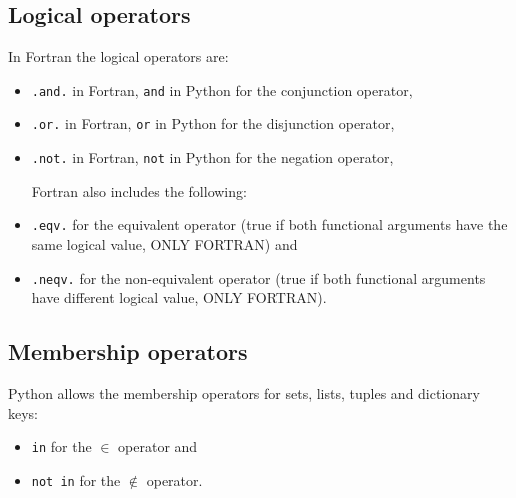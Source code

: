         \subsection*{Logical operators}
        \vspace{-0.5cm}
        In Fortran the logical operators are:
        \vspace{-0.5cm}
        \begin{itemize}[noitemsep]
            \item \texttt{.and.} in Fortran, \texttt{and} in Python for the conjunction operator, 
            \item \texttt{.or.} in Fortran, \texttt{or} in Python for the disjunction operator,
            \item \texttt{.not.} in Fortran, \texttt{not} in Python for the negation operator,
            
            \vspace{0.3cm}
            Fortran also includes the following:
            \item \texttt{.eqv.} for the equivalent operator (true if both functional arguments have the same logical value, ONLY FORTRAN) and
            \item \texttt{.neqv.} for the non-equivalent operator (true if both functional arguments have different logical value, ONLY FORTRAN).
        \end{itemize}
    
        
        
        \subsection*{Membership operators}
        \vspace{-0.5cm}
        Python allows the membership operators for sets, lists, tuples and dictionary keys:
        \vspace{-0.7cm}
        \begin{itemize}[noitemsep]
            \item \texttt{in} for the $\in$ operator and
            \item \texttt{not in} for the $\notin$ operator.
        \end{itemize}        
      
